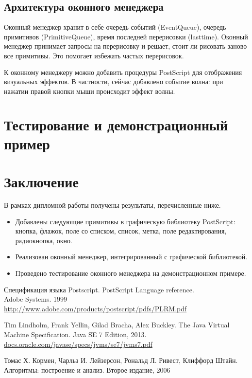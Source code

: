 \documentclass[14pt]{extarticle}
\begin{document}
	\subsection{ Архитектура оконного менеджера}
	Оконный менеджер хранит в себе очередь событий (EventQueue), очередь примитивов (PrimitiveQueue), время последней перерисовки (lasttime). Оконный менеджер принимает запросы на перерисовку и решает, стоит ли рисовать заново все примитивы. Это помогает избежать частых перерисовок.
	
	К оконному менеджеру можно добавить процедуры PostScript для отображения визуальных эффектов. В частности, сейчас добавлено событие волна: при нажатии правой кнопки мыши происходит эффект волны. 
	\pagebreak
	\section{Тестирование и демонстрационный пример}

	\pagebreak
	
	\section*{Заключение}
	
	В рамках дипломной работы получены результаты, перечисленные ниже.
	\begin{itemize}
		\item Добавлены следующие примитивы в графическую библиотеку  PostScript: кнопка, флажок, поле со списком, список, метка, поле редактирования, радиокнопка, окно.
		\item Реализован оконный менеджер, интегрированный с графической библиотекой.
		\item Проведено тестирование оконного менеджера на демонстрационном примере.
	\end{itemize}
	

	
	\pagebreak
	
	
	
	\begin{thebibliography}{}
		
		Спецификация языка Postscript. PostScript Language reference. \\
		Adobe Systems. 1999\\
		\url{http://www.adobe.com/products/postscript/pdfs/PLRM.pdf}
		
		Tim Lindholm, Frank Yellin, Gilad Bracha, Alex Buckley.
		The Java Virtual Machine Specification.
		Java SE 7 Edition, 2013. \\
		\url{docs.oracle.com/javase/specs/jvms/se7/jvms7.pdf}
		
		Томас Х. Кормен, Чарльз И. Лейзерсон, Рональд Л. Ривест, Клиффорд Штайн.
		Алгоритмы: построение и анализ.
		Второе издание, 2006
		
	\end{thebibliography}
\end{document}
